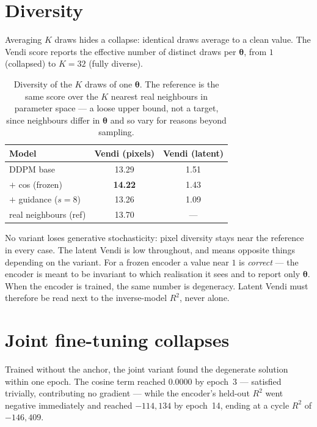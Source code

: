 \documentclass[11pt,a4paper]{article}
\newcommand{\best}[1]{\textbf{#1}}
\begin{document}
\section{Diversity}

Averaging $K$ draws hides a collapse: identical draws average to a clean value. The
Vendi score reports the effective number of distinct draws per $\bm\theta$, from $1$
(collapsed) to $K=32$ (fully diverse).

\begin{table}[htbp]
\centering
\caption{Diversity of the $K$ draws of one $\bm\theta$. The reference is the same score
over the $K$ nearest real neighbours in parameter space --- a loose upper bound, not a
target, since neighbours differ in $\bm\theta$ and so vary for reasons beyond sampling.}
\begin{tabular}{lcc}
\toprule
Model & Vendi (pixels) & Vendi (latent) \\
\midrule
DDPM base            & 13.29 & 1.51 \\
$+$ cos (frozen)     & \best{14.22} & 1.43 \\
$+$ guidance ($s=8$) & 13.26 & 1.09 \\
\midrule
real neighbours (ref)& 13.70 & --- \\
\bottomrule
\end{tabular}
\end{table}

No variant loses generative stochasticity: pixel diversity stays near the reference in
every case. The latent Vendi is low throughout, and means opposite things depending on
the variant. For a frozen encoder a value near $1$ is \emph{correct} --- the encoder is
meant to be invariant to which realisation it sees and to report only $\bm\theta$. When
the encoder is trained, the same number is degeneracy. Latent Vendi must therefore be
read next to the inverse-model $R^{2}$, never alone.

\section{Joint fine-tuning collapses}\label{sec:collapse}

Trained without the anchor, the joint variant found the degenerate solution within one
epoch. The cosine term reached $0.0000$ by epoch~3 --- satisfied trivially, contributing
no gradient --- while the encoder's held-out $R^{2}$ went negative immediately and
reached $-114{,}134$ by epoch~14, ending at a cycle $R^{2}$ of $-146{,}409$.
\end{document}
